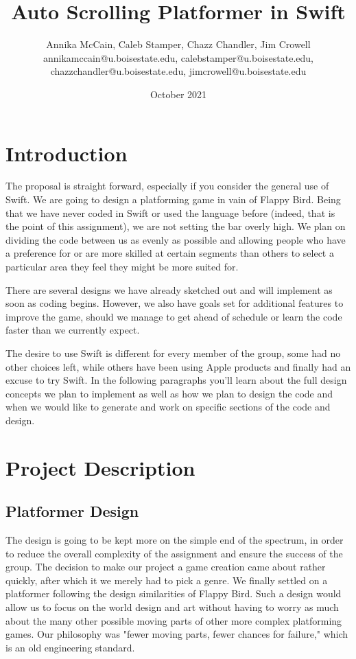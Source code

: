 \documentclass{article}
\title{Auto Scrolling Platformer in Swift}
\author{Annika McCain, Caleb Stamper, Chazz Chandler, Jim Crowell \\ \small annikamccain@u.boisestate.edu, calebstamper@u.boisestate.edu,  \\ \small chazzchandler@u.boisestate.edu, jimcrowell@u.boisestate.edu}
\date{October 2021}
\begin{document}
\maketitle

\section{Introduction}
The proposal is straight forward, especially if you consider the general use of Swift. We are going to design a platforming game in vain of Flappy Bird. Being that we have never coded in Swift or used the language before (indeed, that is the point of this assignment), we are not setting the bar overly high. We plan on dividing the code between us as evenly as possible and allowing people who have a preference for or are more skilled at certain segments than others to select a particular area they feel they might be more suited for. \hfill \break

There are several designs we have already sketched out and will implement as soon as coding begins. However, we also have goals set for additional features to improve the game, should we manage to get ahead of schedule or learn the code faster than we currently expect. \hfill \break 

The desire to use Swift is different for every member of the group, some had no other choices left, while others have been using Apple products and finally had an excuse to try Swift. In the following paragraphs you'll learn about the full design concepts we plan to implement as well as how we plan to design the code and when we would like to generate and work on specific sections of the code and design.\hfill \break

\section{Project Description}
\subsection{Platformer Design}
 The design is going to be kept more on the simple end of the spectrum, in order to reduce the overall complexity of the assignment and ensure the success of the group. The decision to make our project a game creation came about rather quickly, after which it we merely had to pick a genre. We finally settled on a platformer following the design similarities of Flappy Bird\cite{Flappybird}. Such a design would allow us to focus on the world design and art without having to worry as much about the many other possible moving parts of other more complex platforming games. Our philosophy was "fewer moving parts, fewer chances for failure," which is an old engineering standard. \hfill \break 
\end{document}
